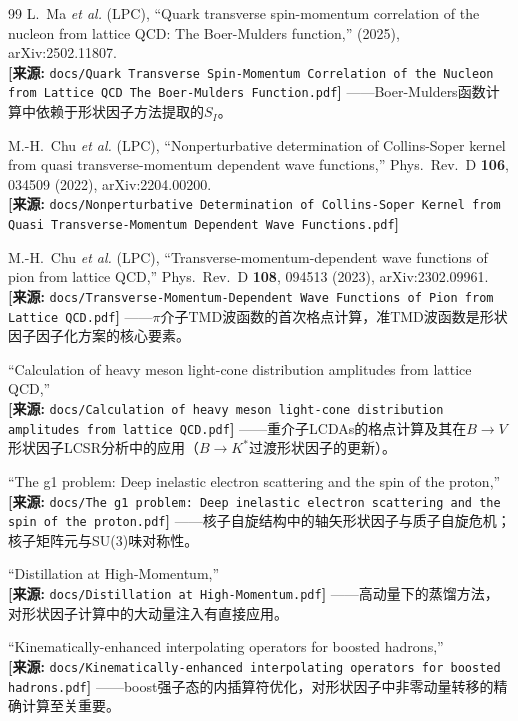 \documentclass[12pt,a4paper]{ctexart}
\theoremstyle{definition}
\begin{document}
\begin{thebibliography}{99}
L.~Ma \textit{et al.} (LPC),
``Quark transverse spin-momentum correlation of the nucleon from lattice QCD: The Boer-Mulders function,''
(2025), arXiv:2502.11807.
\\\textbf{[来源:} \texttt{docs/Quark Transverse Spin-Momentum Correlation of the Nucleon from Lattice QCD The Boer-Mulders Function.pdf}\textbf{]}
——Boer-Mulders函数计算中依赖于形状因子方法提取的$S_I$。

M.-H.~Chu \textit{et al.} (LPC),
``Nonperturbative determination of Collins-Soper kernel from quasi transverse-momentum dependent wave functions,''
Phys.\ Rev.\ D \textbf{106}, 034509 (2022), arXiv:2204.00200.
\\\textbf{[来源:} \texttt{docs/Nonperturbative Determination of Collins-Soper Kernel from Quasi Transverse-Momentum Dependent Wave Functions.pdf}\textbf{]}

M.-H.~Chu \textit{et al.} (LPC),
``Transverse-momentum-dependent wave functions of pion from lattice QCD,''
Phys.\ Rev.\ D \textbf{108}, 094513 (2023), arXiv:2302.09961.
\\\textbf{[来源:} \texttt{docs/Transverse-Momentum-Dependent Wave Functions of Pion from Lattice QCD.pdf}\textbf{]}
——$\pi$介子TMD波函数的首次格点计算，准TMD波函数是形状因子因子化方案的核心要素。

``Calculation of heavy meson light-cone distribution amplitudes from lattice QCD,''
\\\textbf{[来源:} \texttt{docs/Calculation of heavy meson light-cone distribution amplitudes from lattice QCD.pdf}\textbf{]}
——重介子LCDAs的格点计算及其在$B\to V$形状因子LCSR分析中的应用（$B\to K^*$过渡形状因子的更新）。

``The g1 problem: Deep inelastic electron scattering and the spin of the proton,''
\\\textbf{[来源:} \texttt{docs/The g1 problem: Deep inelastic electron scattering and the spin of the proton.pdf}\textbf{]}
——核子自旋结构中的轴矢形状因子与质子自旋危机；核子矩阵元与SU(3)味对称性。

``Distillation at High-Momentum,''
\\\textbf{[来源:} \texttt{docs/Distillation at High-Momentum.pdf}\textbf{]}
——高动量下的蒸馏方法，对形状因子计算中的大动量注入有直接应用。

``Kinematically-enhanced interpolating operators for boosted hadrons,''
\\\textbf{[来源:} \texttt{docs/Kinematically-enhanced interpolating operators for boosted hadrons.pdf}\textbf{]}
——boost强子态的内插算符优化，对形状因子中非零动量转移的精确计算至关重要。


\end{thebibliography}
\end{document}
